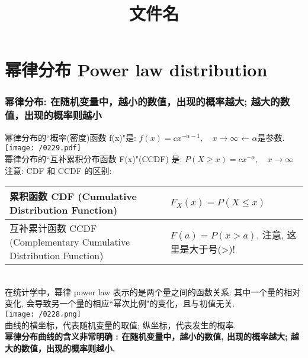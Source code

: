 \documentclass[UTF8]{ctexart}
\title{文件名}
\begin{document}
	\tableofcontents %
	\date{} %
	\maketitle  %
	
	\part{幂律分布 Power law distribution}
	
	\section{幂律分布: 在随机变量中，越小的数值，出现的概率越大; 越大的数值，出现的概率则越小}
	
	幂律分布的``概率(密度)函数 f(x)"是: $\boxed{
		f(x)= cx^{-\alpha -1}, \quad  x \to \infty
	}$ ← $\alpha$是参数. \\

	\texttt{[image: /0229.pdf]} \\

	幂律分布的``互补累积分布函数 F(x)"(CCDF) 是: $\boxed{	P(X \geq x)=cx^{-\alpha}, \quad  x \to \infty }$ \\
	
	注意: CDF 和 CCDF 的区别:  \\
	\begin{tabular}{|p{}|p{}|}
		\hline
		累积函数 CDF (Cumulative Distribution Function) &   $F_X(x)=P(X\leq x)$\\
		\hline
		互补累计函数 CCDF (Complementary Cumulative Distribution Function) & $F(a)=P(x>a)$. 注意, 这里是大于号(>)! \\
		\hline
	\end{tabular} \\

	
	在统计学中，幂律 power law 表示的是两个量之间的函数关系: 其中一个量的相对变化, 会导致另一个量的相应``幂次比例"的变化，且与初值无关. \\
	
	\texttt{[image: /0228.png]} \\
	
	曲线的横坐标，代表随机变量的取值; 纵坐标，代表发生的概率. \\
	\textbf{幂律分布曲线的含义非常明确 : 在随机变量中，越小的数值, 出现的概率越大; 越大的数值，出现的概率则越小.} 
	
\end{document}
